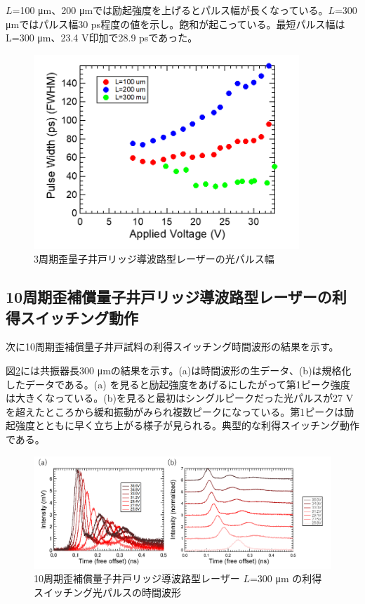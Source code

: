 {$L$=100 \si{\micro\metre}、200 \si{\micro\metre}では励起強度を上げるとパルス幅が長くなっている。$L$=300 \si{\micro\metre}ではパルス幅30 ps程度の値を示し。飽和が起こっている。最短パルス幅はL=300 \si{\micro m}、23.4 V印加で28.9 psであった。
\begin{figure}[ht]
	\centering
	\includegraphics[width=10cm]{figure/fig_3_2_3QW_ridge_GS_FWHM.png}
		\caption{3周期歪量子井戸リッジ導波路型レーザーの光パルス幅}
		\label{fig:fig_3_2_3QW_ridge_GS_FWHM}
\end{figure}
\clearpage
\subsection{10周期歪補償量子井戸リッジ導波路型レーザーの利得スイッチング動作}%
次に10周期歪補償量子井戸試料の利得スイッチング時間波形の結果を示す。

図\ref{fig:fig_3_2_10QW_ridge_L300_GS}には共振器長300 \si{\micro\metre}の結果を示す。(a)は時間波形の生データ、(b)は規格化したデータである。(a) を見ると励起強度をあげるにしたがって第1ピーク強度は大きくなっている。(b)を見ると最初はシングルピークだった光パルスが27 Vを超えたところから緩和振動がみられ複数ピークになっている。第1ピークは励起強度とともに早く立ち上がる様子が見られる。典型的な利得スイッチング動作である。
\begin{figure}[h]
	\centering
	\includegraphics[width=15cm]{figure/fig_3_2_10QW_ridge_L300_GS.png}
		\caption{10周期歪補償量子井戸リッジ導波路型レーザー $L$=300 \si{\micro\metre} の利得スイッチング光パルスの時間波形}
		\label{fig:fig_3_2_10QW_ridge_L300_GS}
\end{figure}


}
